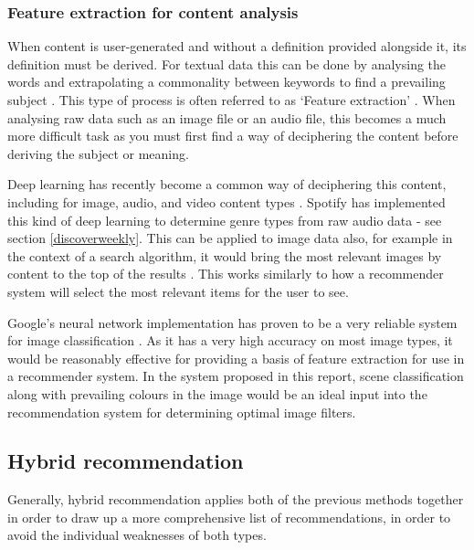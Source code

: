 \documentclass[a4paper,12pt]{report}
\begin{document}
      \subsubsection{Feature extraction for content analysis}
        When content is user-generated and without a definition provided alongside it, its definition must be derived. For textual data this can be done by analysing the words and extrapolating a commonality between keywords to find a prevailing subject \citep{sanderson1999deriving}.
        This type of process is often referred to as ‘Feature extraction’ \citep{guyon2006introduction}.
        When analysing raw data such as an image file or an audio file, this becomes a much more difficult task as you must first find a way of deciphering the content before deriving the subject or meaning.

        Deep learning has recently become a common way of deciphering this content, including for image, audio, and video content types \citep{coates2011analysis,ciregan2012multi,lee2009unsupervised,mobahi2009deep}.
        Spotify has implemented this kind of deep learning to determine genre types from raw audio data - see section \ref{discoverweekly}.
        This can be applied to image data also, for example in the context of a search algorithm, it would bring the most relevant images by content to the top of the results \citep{yee2003faceted}. This works similarly to how a recommender system will select the most relevant items for the user to see.

        Google's neural network implementation has proven to be a very reliable system for image classification \citep{krizhevsky2012imagenet}.
        As it has a very high accuracy on most image types, it would be reasonably effective for providing a basis of feature extraction for use in a recommender system. In the system proposed in this report, scene classification along with prevailing colours in the image would be an ideal input into the recommendation system for determining optimal image filters.

    \subsection{Hybrid recommendation}
      Generally, hybrid recommendation applies both of the previous methods together in order to draw up a more comprehensive list of recommendations, in order to avoid the individual weaknesses of both types.
\end{document}
